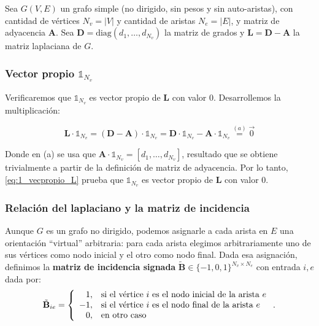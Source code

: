 \documentclass{article}
\begin{document}
\newcommand{\ones}[1]{\mathbb{1}_{#1}}
\newcommand{\lap}{\mathbf{L}}
\newcommand{\diag}{\mathbf{D}}
\newcommand{\adj}{\mathbf{A}}
\newcommand{\bm}{\tilde{\mathbf{B}}}
\newcommand{\x}{\mathbf{x}}

Sea $G(V,E)$ un grafo simple (no dirigido, sin pesos y sin auto-aristas), con cantidad de vértices $N_v = |V|$ y cantidad de aristas $N_e = |E|$, y matriz de adyacencia $\mathbf{A}$. Sea $\mathbf{D} = \text{diag}(d_{1},\dots, d_{N_v})$ la matriz de grados y $\mathbf{L}=\mathbf{D}- \mathbf{A}$ la matriz laplaciana de $G$.

\subsubsection{Vector propio $\ones{N_v}$}
\label{subsec:vector_propio_1}

Verificaremos que $\ones{N_v}$ es vector propio de $\lap$ con valor 0. Desarrollemos la multiplicación:

\begin{equation}
    \lap \cdot \ones{N_v} = (\diag - \adj) \cdot \ones{N_v}  = \diag \cdot \ones{N_v} - \adj \cdot \ones{N_v} \stackrel{(a)}{=} \vec{0}
    \label{eq:1_vecpropio_L}
\end{equation}

Donde en (a) se usa que $\adj \cdot \ones{N_v} = [d_1, \dots, d_{N_v}]$, resultado que
se obtiene trivialmente a partir de la definición de matriz de adyacencia.
Por lo tanto, \eqref{eq:1_vecpropio_L} prueba que $\ones{N_v}$ es vector propio de $\lap$ con valor 0.

\subsubsection{Relación del laplaciano y la matriz de incidencia}

Aunque $G$ es un grafo no dirigido, podemos asignarle a cada arista en $E$ una orientación ``virtual'' arbitraria: para cada arista elegimos arbitrariamente uno de sus vértices como nodo inicial y el otro como nodo final. Dada esa asignación, definimos la \textbf{matriz de incidencia signada} $\bm \in \{-1,0,1\}^{N_v\times N_e}$ con entrada $i,e$ dada por:
\begin{equation}
    \bm_{ie} = \left\lbrace
    \begin{array}{r l}
        1,  & \text{si el vértice } i \text{ es el nodo inicial de la arista } e \\
        -1, & \text{si el vértice } i \text{ es el nodo final de la arista } e   \\
        0,  & \text{en otro caso}
    \end{array}
    \right. .
    \label{eq:matrix_incidencia}
\end{equation}
\end{document}
